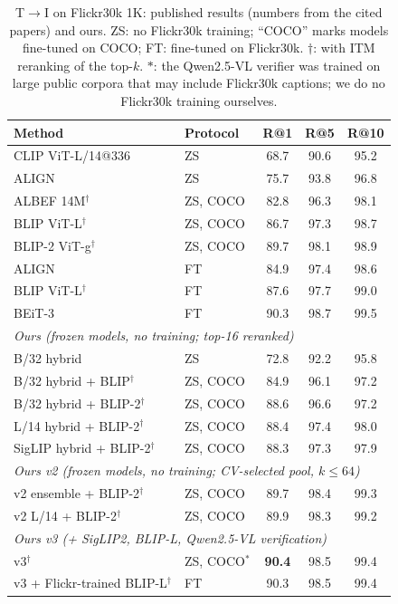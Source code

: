 \documentclass[conference]{IEEEtran}
\newcommand{\RA}{\ensuremath{\rightarrow}}
\newcommand{\best}[1]{\textbf{#1}}
\begin{document}
\begin{table}[t]
\centering
\caption{T\RA I on Flickr30k 1K: published results (numbers from the cited papers) and ours. ZS: no
Flickr30k training; ``COCO'' marks models fine-tuned on COCO; FT: fine-tuned on Flickr30k. $\dagger$: with
ITM reranking of the top-$k$. $\ast$: the Qwen2.5-VL verifier was trained on large public corpora that may include
Flickr30k captions; we do no Flickr30k training ourselves.}
\label{tab:published}
\setlength{\tabcolsep}{3.5pt}
\begin{tabular}{l l ccc}
\toprule
Method & Protocol & R@1 & R@5 & R@10 \\
\midrule
CLIP ViT-L/14@336~\cite{radford2021clip}  & ZS          & 68.7 & 90.6 & 95.2 \\
ALIGN~\cite{jia2021align}                 & ZS          & 75.7 & 93.8 & 96.8 \\
\midrule
ALBEF 14M$^\dagger$~\cite{li2021albef}    & ZS, COCO    & 82.8 & 96.3 & 98.1 \\
BLIP ViT-L$^\dagger$~\cite{li2022blip}    & ZS, COCO    & 86.7 & 97.3 & 98.7 \\
BLIP-2 ViT-g$^\dagger$~\cite{li2023blip2} & ZS, COCO    & 89.7 & 98.1 & 98.9 \\
\midrule
ALIGN~\cite{jia2021align}                 & FT          & 84.9 & 97.4 & 98.6 \\
BLIP ViT-L$^\dagger$~\cite{li2022blip}    & FT          & 87.6 & 97.7 & 99.0 \\
BEiT-3~\cite{wang2023beit3}               & FT          & 90.3 & 98.7 & 99.5 \\
\midrule
\multicolumn{5}{l}{\emph{Ours (frozen models, no training; top-16 reranked)}} \\
B/32 hybrid                               & ZS          & 72.8 & 92.2 & 95.8 \\
B/32 hybrid + BLIP$^\dagger$              & ZS, COCO    & 84.9 & 96.1 & 97.2 \\
B/32 hybrid + BLIP-2$^\dagger$            & ZS, COCO    & 88.6 & 96.6 & 97.2 \\
L/14 hybrid + BLIP-2$^\dagger$            & ZS, COCO    & 88.4 & 97.4 & 98.0 \\
SigLIP hybrid + BLIP-2$^\dagger$          & ZS, COCO    & 88.3 & 97.3 & 97.9 \\
\multicolumn{5}{l}{\emph{Ours v2 (frozen models, no training; CV-selected pool, $k\le 64$)}} \\
v2 ensemble + BLIP-2$^\dagger$            & ZS, COCO    & 89.7 & 98.4 & 99.3 \\
v2 L/14 + BLIP-2$^\dagger$                & ZS, COCO    & 89.9 & 98.3 & 99.2 \\
\multicolumn{5}{l}{\emph{Ours v3 (+ SigLIP2, BLIP-L, Qwen2.5-VL verification)}} \\
v3$^\dagger$                              & ZS, COCO$^\ast$ & \best{90.4} & 98.5 & 99.4 \\
v3 + Flickr-trained BLIP-L$^\dagger$      & FT          & 90.3 & 98.5 & 99.4 \\
\bottomrule
\end{tabular}
\end{table}
\end{document}
